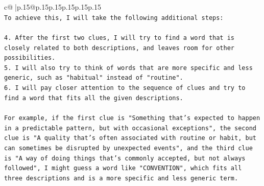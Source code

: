\documentclass{article}
\begin{document}
{\begin{supertabular}{c@{$\;$}|p{.15\linewidth}@{}p{.15\linewidth}p{.15\linewidth}p{.15\linewidth}p{.15\linewidth}p{.15\linewidth}}
{{{\\ 
\texttt{To achieve this, I will take the following additional steps:} \\
\\ 
\texttt{4. After the first two clues, I will try to find a word that is closely related to both descriptions, and leaves room for other possibilities.} \\
\texttt{5. I will also try to think of words that are more specific and less generic, such as "habitual" instead of "routine".} \\
\texttt{6. I will pay closer attention to the sequence of clues and try to find a word that fits all the given descriptions.} \\
\\ 
\texttt{For example, if the first clue is "Something that's expected to happen in a predictable pattern, but with occasional exceptions", the second clue is "A quality that's often associated with routine or habit, but can sometimes be disrupted by unexpected events", and the third clue is "A way of doing things that's commonly accepted, but not always followed", I might guess a word like "CONVENTION", which fits all three descriptions and is a more specific and less generic term.} \\
            }
        }
    }
     \\ \\

\end{supertabular}
}
\end{document}
